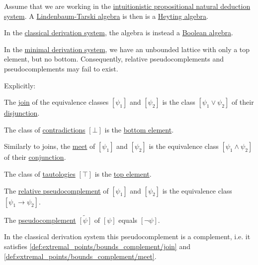 \begin{proposition}\label{thm:intuitionistic_lindenbaum_tarski_algebra}
  Assume that we are working in the \hyperref[def:intuitionistic_propositional_deductive_systems]{intuitionistic propositional natural deduction system}. A \hyperref[def:lindenbaum_tarski_algebra]{Lindenbaum-Tarski algebra} is then is a \hyperref[def:heyting_algebra]{Heyting algebra}.

  In the \hyperref[def:classical_propositional_deductive_systems]{classical derivation system}, the algebra is instead a \hyperref[def:boolean_algebra]{Boolean algebra}.

  In the \hyperref[def:minimal_propositional_hilbert_system]{minimal derivation system}, we have an unbounded lattice with only a top element, but no bottom. Consequently, relative pseudocomplements and pseudocomplements may fail to exist.

  Explicitly:
  \begin{thmenum}
     The \hyperref[def:lattice/join]{join} of the equivalence classes \( [\psi_1] \) and \( [\psi_2] \) is the class \( [\psi_1 \vee \psi_2] \) of their \hyperref[def:propositional_language/connectives/disjunction]{disjunction}.

     The class of \hyperref[def:propositional_semantics/contradiction]{contradictions} \( [\bot] \) is the \hyperref[def:extremal_points/top_and_bottom]{bottom element}.

     Similarly to joins, the \hyperref[def:lattice/meet]{meet} of \( [\psi_1] \) and \( [\psi_2] \) is the equivalence class \( [\psi_1 \wedge \psi_2] \) of their \hyperref[def:propositional_language/connectives/conjunction]{conjunction}.

     The class of \hyperref[def:propositional_semantics/tautology]{tautologies} \( [\top] \) is the \hyperref[def:extremal_points/top_and_bottom]{top element}.

     The \hyperref[def:heyting_algebra]{relative pseudocomplement} of \( [\psi_1] \) and \( [\psi_2] \) is the equivalence class \( [\psi_1 \rightarrow \psi_2] \).

     The \hyperref[eq:def:heyting_algebra/pseudocomplement]{pseudocomplement} \( \widetilde{[\psi]} \) of \( [\psi] \) equals \( [\neg \psi] \).

    In the classical derivation system this pseudocomplement is a complement, i.e. it satisfies \eqref{def:extremal_points/bounds_complement/join} and \eqref{def:extremal_points/bounds_complement/meet}.
  \end{thmenum}
\end{proposition}
